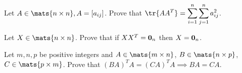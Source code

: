 \begin{pro}
Let $A \in \mats{n\times n}, A = [a_{ij}]$. Prove that
$\displaystyle \tr{AA^T} = \sum _{i = 1} ^n \sum _{j = 1} ^n a_{ij} ^2$.
\end{pro}

\begin{pro}
Let $X\in\mats{n\times n}$. Prove that if $XX^T = {\bf 0}_n$
then $X={\bf 0}_n$.
\end{pro}
\begin{pro}
Let $m,n,p$ be positive integers and $A\in\mats{m\times n}$,
$B\in\mats{n\times p}$, $C\in\mats{p\times m}$. Prove that
$(BA)^TA = (CA)^TA \implies BA = CA$.
\end{pro}





